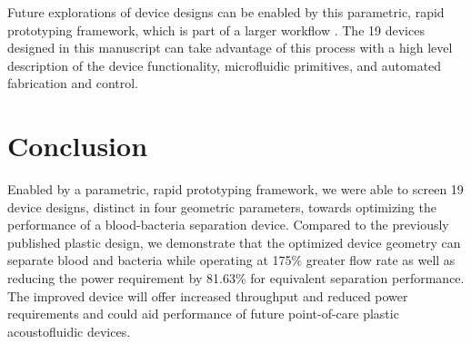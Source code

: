 Future explorations of device designs can be enabled by this parametric, rapid prototyping framework, which is part of a larger workflow \cite{ali2017iwbda}\cite{lippai2017iwbda}\cite{krishna2017iwbda}. The 19 devices designed in this manuscript can take advantage of this process with a high level description of the device functionality, microfluidic primitives, and automated fabrication and control.



\section{Conclusion}
\label{sec:conclusion}
Enabled by a parametric, rapid prototyping framework, we were able to screen 19 device designs, distinct in four geometric parameters, towards optimizing the performance of a blood-bacteria separation device. Compared to the previously published plastic design, we demonstrate that the optimized device geometry can separate blood and bacteria while operating at 175\% greater flow rate as well as reducing the power requirement by 81.63\% for equivalent separation performance.   The improved device will offer increased throughput and reduced power requirements and could aid performance of future point-of-care plastic acoustofluidic devices.
